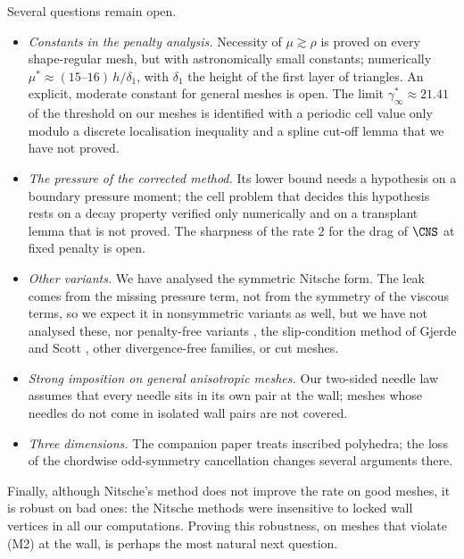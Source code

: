 Several questions remain open.
\begin{itemize}
\item \emph{Constants in the penalty analysis.} Necessity of $\mu\gtrsim\rho$ is proved on every shape-regular mesh, but with astronomically small constants; numerically $\mu^\ast\approx(15\text{--}16)\,h/\delta_1$, with $\delta_1$ the height of the first layer of triangles. An explicit, moderate constant for general meshes is open. The limit $\gamma^\ast_\infty\approx21.41$ of the threshold on our meshes is identified with a periodic cell value only modulo a discrete localisation inequality and a spline cut-off lemma that we have not proved.
\item \emph{The pressure of the corrected method.} Its lower bound needs a hypothesis on a boundary pressure moment; the cell problem that decides this hypothesis rests on a decay property verified only numerically and on a transplant lemma that is not proved. The sharpness of the rate $2$ for the drag of $\CNS$ at fixed penalty is open.
\item \emph{Other variants.} We have analysed the symmetric Nitsche form. The leak comes from the missing pressure term, not from the symmetry of the viscous terms, so we expect it in nonsymmetric variants as well, but we have not analysed these, nor penalty-free variants \cite{Burman2012,BoiveauBurman2016}, the slip-condition method of Gjerde and Scott \cite{GjerdeScott2022}, other divergence-free families, or cut meshes.
\item \emph{Strong imposition on general anisotropic meshes.} Our two-sided needle law assumes that every needle sits in its own pair at the wall; meshes whose needles do not come in isolated wall pairs are not covered.
\item \emph{Three dimensions.} The companion paper \cite{PadhiThreeD} treats inscribed polyhedra; the loss of the chordwise odd-symmetry cancellation changes several arguments there.
\end{itemize}
Finally, although Nitsche's method does not improve the rate on good meshes, it is robust on bad ones: the Nitsche methods were insensitive to locked wall vertices in all our computations. Proving this robustness, on meshes that violate (M2) at the wall, is perhaps the most natural next question.
